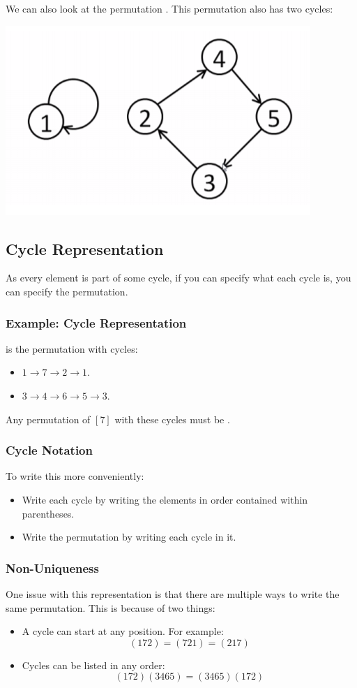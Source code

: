 \documentclass[letterpaper]{article}
\begin{document}
We can also look at the permutation . This permutation also has two cycles:
\begin{center}
    \includegraphics[scale=0.5]{img/ex_cycle_2.PNG}
\end{center}

\subsection{Cycle Representation}
As every element is part of some cycle, if you can specify what each cycle is, you can specify the permutation. 

\subsubsection{Example: Cycle Representation}
 is the permutation with cycles:
\begin{itemize}
    \item $1 \to 7 \to 2 \to 1$.
    \item $3 \to 4 \to 6 \to 5 \to 3$.
\end{itemize}
Any permutation of $[7]$ with these cycles must be .

\subsubsection{Cycle Notation}
To write this more conveniently:
\begin{itemize}
    \item Write each cycle by writing the elements in order contained within parentheses.
    \item Write the permutation by writing each cycle in it. 
\end{itemize}

\subsubsection{Non-Uniqueness}
One issue with this representation is that there are multiple ways to write the same permutation. This is because of two things:
\begin{itemize}
    \item A cycle can start at any position. For example:
    \[(172) = (721) = (217)\]
    
    \item Cycles can be listed in any order:
    \[(172)(3465) = (3465)(172)\]
\end{itemize}
\end{document}
